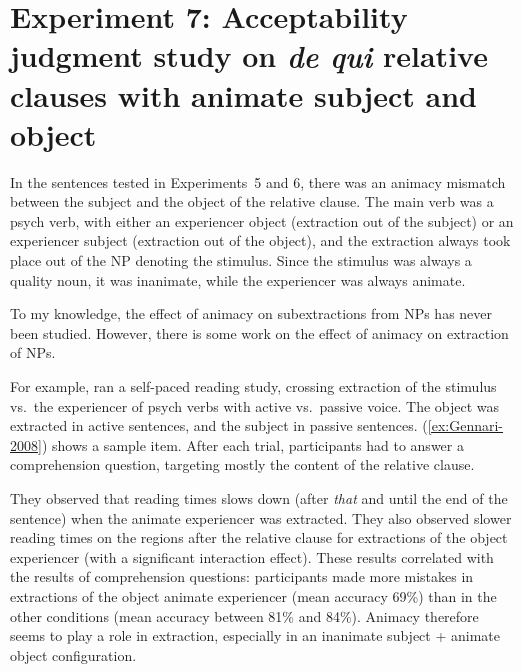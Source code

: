\section[head=Experiment 7]{Experiment 7: Acceptability judgment study on \emph{de qui} relative clauses with animate subject and object}
\label{ch:exp07}

In the sentences tested in Experiments~5 and 6, there was an animacy mismatch between the subject and the object of the relative clause. The main verb was a psych verb, with either an experiencer object (extraction out of the subject) or an experiencer subject (extraction out of the object), and the extraction always took place out of the NP denoting the stimulus. Since the stimulus was always a quality noun, it was inanimate, while the experiencer was always animate. 

To my knowledge, the effect of animacy on subextractions from NPs has never been studied. However, there is some work on the effect of animacy on extraction of NPs. 

For example, \citet{Gennari.2008} ran a self-paced reading study, crossing extraction of the stimulus vs.\ the experiencer of psych verbs with active vs.\ passive voice. The object was extracted in active sentences, and the subject in passive sentences. (\ref{ex:Gennari-2008}) shows a sample item. After each trial, participants had to answer a comprehension question, targeting mostly the content of the relative clause.

\eal \label{ex:Gennari-2008}
\zl 

They observed that reading times slows down (after \emph{that} and until the end of the sentence) when the animate experiencer was extracted. They also observed slower reading times on the regions after the relative clause for extractions of the object experiencer (with a significant interaction effect). These results correlated with the results of comprehension questions: participants made more mistakes in extractions of the object animate experiencer (mean accuracy 69\%) than in the other conditions (mean accuracy between 81\% and 84\%). Animacy therefore seems to play a role in extraction, especially in an inanimate subject + animate object configuration.

